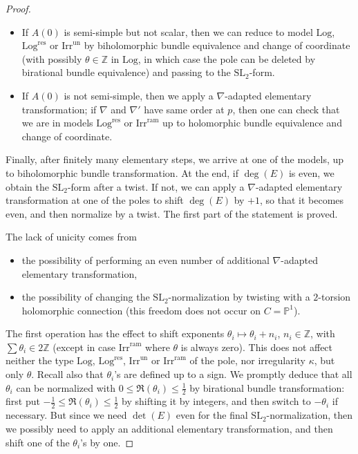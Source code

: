 \documentclass[12]{amsart}
\newcommand{\SL}{\mathrm{SL}_2}
\newcommand{\Log}{\boldsymbol{\mathrm{Log}}}
\newcommand{\Logres}{\boldsymbol{\mathrm{Log}^{\mathrm{res}}}}
\newcommand{\Irrun}{\boldsymbol{\mathrm{Irr}^{\mathrm{un}}}}
\newcommand{\Irram}{\boldsymbol{\mathrm{Irr}^{\mathrm{ram}}}}
\begin{document}
\begin{proof}
\begin{itemize}
\item If $A(0)$ is semi-simple but not scalar, then we can reduce to model $\Log$, $\Logres$ or $\Irrun$ 
by biholomorphic bundle equivalence and change of coordinate
(with possibly $\theta\in\mathbb Z$ in $\Log$, in which case the pole can be deleted by birational bundle equivalence)
and passing to the $\SL$-form.
\item If $A(0)$ is not semi-simple, then we apply a $\nabla$-adapted elementary transformation;
if $\nabla$ and $\nabla'$ have same order at $p$, then one can check that we are in models $\Logres$ or 
$\Irram$ up to holomorphic bundle equivalence and change of coordinate. 
\end{itemize}
Finally, after finitely many elementary steps, we arrive at one of the models, up to biholomorphic bundle transformation.
At the end, if $\deg(E)$ is even, we obtain the $\SL$-form after a twist. If not, we can apply a $\nabla$-adapted 
elementary transformation at one of the poles to shift $\deg(E)$ by $+1$, so that it becomes even, and then normalize by a twist. 
The first part of the statement is proved. 

The lack of unicity comes from 
\begin{itemize}
\item the possibility of performing an even number of additional $\nabla$-adapted elementary transformation,
\item the possibility of changing the $\SL$-normalization by twisting with a $2$-torsion holomorphic connection
(this freedom does not occur on $C=\mathbb P^1$).
\end{itemize}
The first operation has the effect to shift exponents $\theta_i\mapsto\theta_i+n_i$, $n_i\in\mathbb Z$, with $\sum\theta_i\in 2\mathbb Z$
(except in case $\Irram$ where $\theta$ is always zero). This does not affect neither the type $\Log$, $\Logres$, $\Irrun$ or $\Irram$
of the pole, nor irregularity $\kappa$, but only $\theta$. Recall also that $\theta_i$'s are defined up to a sign. We promptly 
deduce that all $\theta_i$ can be normalized with $0\le\Re(\theta_i)\le\frac{1}{2}$ by birational bundle transformation:
first put $-\frac{1}{2}\le\Re(\theta_i)\le\frac{1}{2}$ by shifting it by integers, and then switch to $-\theta_i$ if necessary.
But since we need $\det(E)$ even for the final $\SL$-normalization, then we possibly need to apply an additional
elementary transformation, and then shift one of the $\theta_i$'s by one.
\end{proof}
\end{document}
